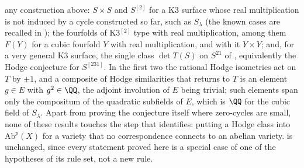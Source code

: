 \begin{remark}
any construction above: $S\times S$ and $S^{[2]}$ for a K3 surface
whose real multiplication is not induced by a cycle constructed so far, such
as $S_{\lambda}$
(the known cases are recalled in ); the fourfolds of
K3$^{[2]}$ type with real multiplication, among them $F(Y)$ for a cubic
fourfold $Y$ with real multiplication, and with it $Y\times Y$; and, for a
very general K3 surface, the single class $\det T(S)$ on $S^{21}$ of
, equivalently the Hodge conjecture for $S^{[231]}$.
In the first two the
rational Hodge isometries \cite{Bus19,Mar24} act on $T$ by $\pm1$, and a
composite of Hodge similarities that returns to $T$ is an element $g\in E$
with $g^{2}\in\QQ$, the adjoint involution of $E$ being trivial; such
elements span only the compositum of the quadratic subfields of $E$, which is
$\QQ$ for the cubic field of $S_{\lambda}$. Apart from proving the
conjecture itself where zero-cycles are small, none of these results touches
the step that
 identifies: putting a Hodge class into
$\mathrm{Ab}^{p}(X)$ for a variety that no correspondence connects to an
abelian variety.  is unchanged, since every statement
proved here is a special case of one of the hypotheses of its rule set, not a
new rule.
\end{remark}

